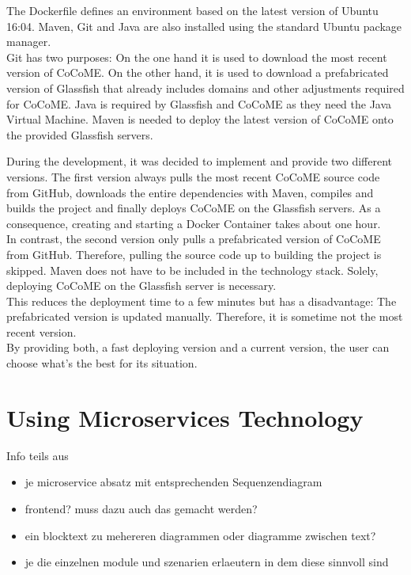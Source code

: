 The Dockerfile defines an environment based on the latest version of Ubuntu 16:04. Maven, Git and Java are also installed using the standard Ubuntu package manager.\\
Git has two purposes: On the one hand it is used to download the most recent version of CoCoME.	On the other hand, it is used to download a prefabricated version of Glassfish that already includes domains and other adjustments required for CoCoME. Java is required by Glassfish and CoCoME as they need the Java Virtual Machine. Maven is needed to deploy the latest version of CoCoME onto the provided Glassfish servers.
	
	
	During the development, it was decided to implement and provide two different versions. The first version always pulls the most recent CoCoME source code from GitHub, downloads the entire dependencies with Maven, compiles and builds the project and finally deploys CoCoME on the Glassfish servers. As a consequence, creating and starting a Docker Container takes about one hour.\\
	In contrast, the second version only pulls a prefabricated version of CoCoME from GitHub. 
	Therefore, pulling the source code up to building the project is skipped. Maven does not have to be included in the technology stack. Solely, deploying CoCoME on the Glassfish server is necessary.\\
	This reduces the deployment time to a few minutes but has a disadvantage: The prefabricated version is updated manually. Therefore, it is sometime not the most recent version.\\
	By providing both, a fast deploying version and a current version, the user can choose what's the best for its situation.
	

	

	
\section{Using Microservices Technology} \label{MS}

Info teils aus \cite{sommer}
	\begin{itemize}
		\item je microservice absatz mit entsprechenden Sequenzendiagram %
		\item frontend? muss dazu auch das gemacht werden?
		\item ein blocktext zu mehereren diagrammen oder diagramme zwischen text?
		
	
			\item je die einzelnen module und szenarien erlaeutern in dem diese sinnvoll sind
	\end{itemize}
	
